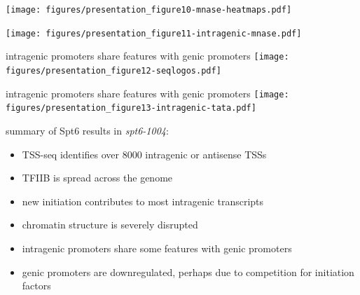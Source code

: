 \documentclass[aspectratio=169]{beamer}
\begin{document}
\begin{frame}
\texttt{[image: figures/presentation\_figure10-mnase-heatmaps.pdf]}
\end{frame}

\begin{frame}
\texttt{[image: figures/presentation\_figure11-intragenic-mnase.pdf]}
\end{frame}

\begin{frame}{intragenic promoters share features with genic promoters}
    \texttt{[image: figures/presentation\_figure12-seqlogos.pdf]}
\end{frame}

\begin{frame}{intragenic promoters share features with genic promoters}
    \texttt{[image: figures/presentation\_figure13-intragenic-tata.pdf]}
\end{frame}

\begin{frame}{summary of Spt6 results}
    in \textit{spt6-1004}:
    \begin{itemize}
        \item TSS-seq identifies over 8000 intragenic or antisense TSSs
        \item TFIIB is spread across the genome
        \item new initiation contributes to most intragenic transcripts
        \item chromatin structure is severely disrupted
        \item intragenic promoters share some features with genic promoters
        \item genic promoters are downregulated, perhaps due to competition for initiation factors
    \end{itemize}
\end{frame}
\end{document}
